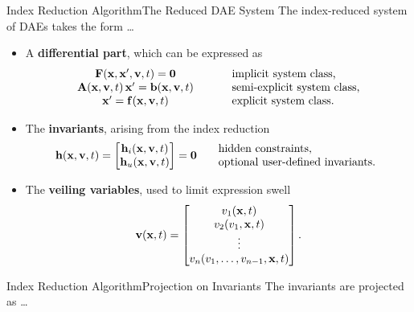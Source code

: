 \begin{frame}{Index Reduction Algorithm}{The Reduced \ac{DAE} System}
  The index-reduced system of \acp{DAE} takes the form \dots
  \begin{itemize}[<+->]
    \item A \textbf{differential part}, which can be expressed as
    \begin{equation*}
      \begin{array}{ccl}
          \mathbf{F}(\mathbf{x}, \mathbf{x}^\prime, \mathbf{v}, t) = \mathbf{0} & \hspace{0.5cm} & \text{implicit  system class,} \\
          \mathbf{A}(\mathbf{x}, \mathbf{v}, t) \, \mathbf{x}^\prime = \mathbf{b}(\mathbf{x}, \mathbf{v}, t) & \hspace{0.5cm} & \text{semi-explicit system class,} \\
          \mathbf{x}^\prime = \mathbf{f}(\mathbf{x}, \mathbf{v}, t) & \hspace{0.5cm} & \text{explicit system class.}
      \end{array}
    \end{equation*}
    \item The \textbf{invariants}, arising from the index reduction
    \begin{equation*}
      \mathbf{h}(\mathbf{x}, \mathbf{v}, t) = \begin{bmatrix}
          \mathbf{h}_{i}(\mathbf{x}, \mathbf{v}, t) \\
          \mathbf{h}_{u}(\mathbf{x}, \mathbf{v}, t)
      \end{bmatrix} = \mathbf{0} \hspace{0.5cm} \begin{array}{l}
        \text{hidden constraints,} \\
        \text{optional user-defined invariants.}
    \end{array}
    \end{equation*}
    \item The \textbf{veiling variables}, used to limit expression swell
    \begin{equation*}
        \mathbf{v}(\mathbf{x}, t) = \begin{bmatrix}
            v_{1}(\mathbf{x}, t) \\
            v_{2}(v_{1}, \mathbf{x}, t) \\
            \vdots \\
            v_{n}(v_{1}, \dots, v_{n-1}, \mathbf{x}, t)
        \end{bmatrix} \text{.}
    \end{equation*}
  \end{itemize}
\end{frame}

\begin{frame}{Index Reduction Algorithm}{Projection on Invariants}
  The invariants are projected as \dots
\end{frame}


